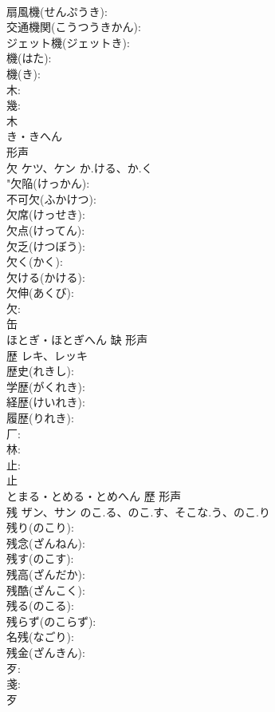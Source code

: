 \documentclass[8pt]{extreport}
\begin{document}
\begin{CJK}{UTF8}{min}
\\	扇風機(せんぷうき): 
\\	交通機関(こうつうきかん): 
\\	ジェット機(ジェットき): 
\\	機(はた): 
\\	機(き): 
\\	木: 
\\	幾: 
\\	木	
\\	き・きへん	
\\	形声 
\\	欠	ケツ、ケン	か.ける、か.く		
\\	"欠陥(けっかん): 
\\	不可欠(ふかけつ): 
\\	欠席(けっせき): 
\\	欠点(けってん): 
\\	欠乏(けつぼう): 
\\	欠く(かく): 
\\	欠ける(かける): 
\\	欠伸(あくび): 
\\	欠: 
\\	缶	
\\	ほとぎ・ほとぎへん	缺	形声 
\\	歴	レキ、レッキ			
\\	歴史(れきし): 
\\	学歴(がくれき): 
\\	経歴(けいれき): 
\\	履歴(りれき): 
\\	厂: 
\\	林: 
\\	止: 
\\	止	
\\	とまる・とめる・とめへん	歷	形声 
\\	残	ザン、サン	のこ.る、のこ.す、そこな.う、のこ.り		
\\	残り(のこり): 
\\	残念(ざんねん): 
\\	残す(のこす): 
\\	残高(ざんだか): 
\\	残酷(ざんこく): 
\\	残る(のこる): 
\\	残らず(のこらず): 
\\	名残(なごり): 
\\	残金(ざんきん): 
\\	歹: 
\\	戔: 
\\	歹	

\end{CJK}
\end{document}
